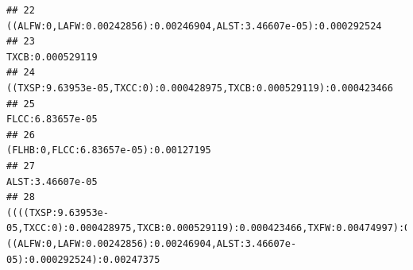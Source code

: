 \documentclass[]{article}
\begin{document}
\begin{verbatim}
## 22                                                                                                                                                                                                                                                                                                                                                             ((ALFW:0,LAFW:0.00242856):0.00246904,ALST:3.46607e-05):0.000292524
## 23                                                                                                                                                                                                                                                                                                                                                                                                               TXCB:0.000529119
## 24                                                                                                                                                                                                                                                                                                                                                           ((TXSP:9.63953e-05,TXCC:0):0.000428975,TXCB:0.000529119):0.000423466
## 25                                                                                                                                                                                                                                                                                                                                                                                                               FLCC:6.83657e-05
## 26                                                                                                                                                                                                                                                                                                                                                                                           (FLHB:0,FLCC:6.83657e-05):0.00127195
## 27                                                                                                                                                                                                                                                                                                                                                                                                               ALST:3.46607e-05
## 28                                                                                                                                                                                                                                              ((((TXSP:9.63953e-05,TXCC:0):0.000428975,TXCB:0.000529119):0.000423466,TXFW:0.00474997):0.00280452,((ALFW:0,LAFW:0.00242856):0.00246904,ALST:3.46607e-05):0.000292524):0.00247375

\end{verbatim}
\end{document}
